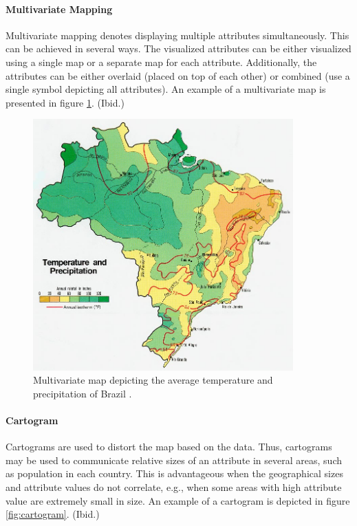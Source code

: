 \paragraph{Multivariate Mapping}

Multivariate mapping denotes displaying multiple attributes simultaneously. This can be achieved in several ways. The visualized attributes can be either visualized using a single map or a separate map for each attribute. Additionally, the attributes can be either overlaid (placed on top of each other) or combined (use a single symbol depicting all attributes). An example of a multivariate map is presented in figure \ref{fig:multivariate}. (Ibid.)

\begin{figure}[htbp]
  \begin{center}
    \includegraphics[width=10cm]{images/multivariate-example.jpg}
    \caption{Multivariate map depicting the average temperature and precipitation of Brazil \citep{central_intelligence_agency_temperature_1977}.}
    \label{fig:multivariate}
  \end{center}
\end{figure}

\paragraph{Cartogram}

Cartograms are used to distort the map based on the data. Thus, cartograms may be used to communicate relative sizes of an attribute in several areas, such as population in each country. This is advantageous when the geographical sizes and attribute values do not correlate, e.g., when some areas with high attribute value are extremely small in size. An example of a cartogram is depicted in figure \ref{fig:cartogram}. (Ibid.)

